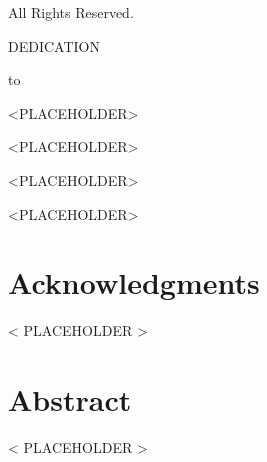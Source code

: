 \documentclass[12pt,parskip=full]{report}
\theoremstyle{plain}
\theoremstyle{definition}
\begin{document}
{{\begin{center}
All Rights Reserved.
\end{center}
}

\setcounter{page}{3}
\newpage
{\singlespacing
\begin{center}
{
\par
\vspace{1.2in}
DEDICATION
\par
\vspace{0.57in}
to
\par
\vspace{1.2in}
<PLACEHOLDER>
\par
\vspace{0.17in}
<PLACEHOLDER>
\par
\vspace{0.17in}
<PLACEHOLDER>
\par
\vspace{0.17in}
<PLACEHOLDER>
\par
\vspace{0.17in}
\par
\vspace{1.2in}
%
\par
\vspace{0.17in}
%
\par
\vfill
}
\end{center}
}


\newpage

\chapter*{Acknowledgments} %

< PLACEHOLDER >


\newpage
\tableofcontents{}

\newpage
\listoffigures

\newpage



\chapter*{Abstract} %

< PLACEHOLDER >

\newpage

} %
\end{document}
